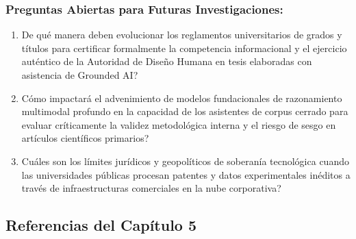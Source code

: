 \subsubsection*{Preguntas Abiertas para Futuras Investigaciones:}
\begin{enumerate}[label=\arabic*., leftmargin=2em, itemsep=0.12em, topsep=0.12em]
    \item \textquestiondown De qué manera deben evolucionar los reglamentos universitarios de grados y títulos para certificar formalmente la competencia informacional y el ejercicio auténtico de la Autoridad de Diseño Humana en tesis elaboradas con asistencia de Grounded AI?
    \item \textquestiondown Cómo impactará el advenimiento de modelos fundacionales de razonamiento multimodal profundo en la capacidad de los asistentes de corpus cerrado para evaluar críticamente la validez metodológica interna y el riesgo de sesgo en artículos científicos primarios?
    \item \textquestiondown Cuáles son los límites jurídicos y geopolíticos de soberanía tecnológica cuando las universidades públicas procesan patentes y datos experimentales inéditos a través de infraestructuras comerciales en la nube corporativa?
\end{enumerate}

\newpage
{}

\subsection*{Referencias del Capítulo 5}

